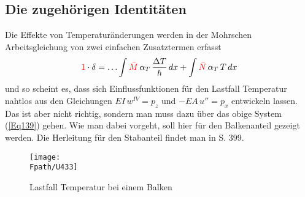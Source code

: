\textcolor{sectionTitleBlue}{\subsection{Die zugeh\"{o}rigen Identit\"{a}ten}}\label{Korrektur40}\label{TempIdentit}
Die Effekte von Temperatur\"{a}nderungen werden in der Mohrschen Arbeitsgleichung von zwei einfachen Zusatztermen erfasst
\begin{align}
\textcolor{red}{1} \cdot \delta = \ldots \int \textcolor{red}{\bar{M}}\,\alpha_T\,\frac{\Delta T}{h}\,dx + \int \textcolor{red}{\bar{N}}\,\alpha_T\,T\,dx
\end{align}
und so scheint es, dass sich Einflussfunktionen f\"{u}r den Lastfall Temperatur nahtlos aus den Gleichungen $EI\,w^{IV} = p_z$ und $-EA\,u'' = p_x$ entwickeln lassen. Das ist aber nicht richtig, sondern man muss dazu \"{u}ber das obige System  (\ref{Eq139}) gehen. Wie man dabei vorgeht, soll hier f\"{u}r den Balkenanteil gezeigt werden. Die Herleitung f\"{u}r den Stabanteil findet man in \cite{Ha5} S. 399.
\begin{figure}[tbp]
\centering
\if {} \sidecaption \fi
\texttt{[image: \\Fpath/U433]}
\caption{Lastfall Temperatur bei einem Balken } \label{U433}
\end{figure}%

